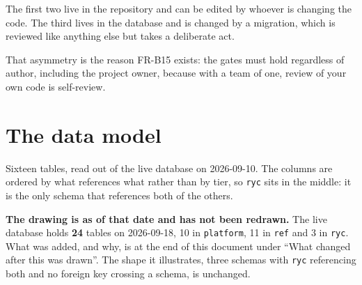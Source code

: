 \documentclass[11pt,a4paper]{article}
\begin{document}
\begin{careful}
The first two live in the repository and can be edited by whoever is changing
the code. The third lives in the database and is changed by a migration, which
is reviewed like anything else but takes a deliberate act.

That asymmetry is the reason FR-B15 exists: the gates must hold regardless of
author, including the project owner, because with a team of one, review of your
own code is self-review.
\end{careful}

\newpage
\section{The data model}

Sixteen tables, read out of the live database on 2026-09-10. The columns are
ordered by what references what rather than by tier, so \texttt{ryc} sits in the
middle: it is the only schema that references both of the others.

\textbf{The drawing is as of that date and has not been redrawn.} The live
database holds \textbf{24} tables on 2026-09-18, 10 in \texttt{platform}, 11 in
\texttt{ref} and 3 in \texttt{ryc}. What was added, and why, is at the end of
this document under ``What changed after this was drawn''. The shape it
illustrates, three schemas with \texttt{ryc} referencing both and no foreign key
crossing a schema, is unchanged.
\end{document}
